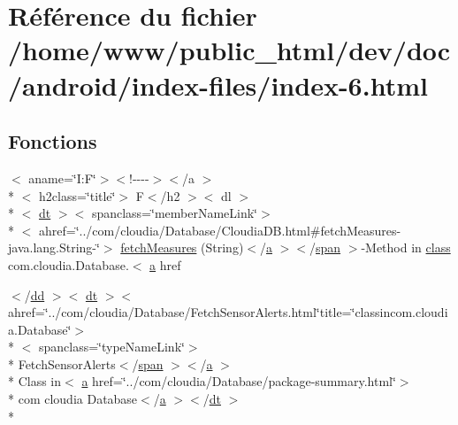\hypertarget{index-6_8html}{\section{Référence du fichier /home/www/public\-\_\-html/dev/doc/android/index-\/files/index-\/6.html}
\label{index-6_8html}
}
\subsection*{Fonctions}
\begin{DoxyCompactItemize}
\item 
$<$ aname=\char`\"{}I\-:\-F\char`\"{}$>$$<$!-\/-\/-\/-\/$>$$<$/a $>$\\*
$<$ h2class=\char`\"{}title\char`\"{}$>$ F$<$/h2 $>$$<$ dl $>$\\*
$<$ \hyperlink{stylesheet_8css_a107565fb4039d33b041380d6e0ea1d80}{dt} $>$$<$ spanclass=\char`\"{}member\-Name\-Link\char`\"{}$>$\\*
$<$ ahref=\char`\"{}../com/cloudia/Database/Cloudia\-D\-B.\-html\#fetch\-Measures-\/java.\-lang.\-String-\/\char`\"{}$>$ \hyperlink{index-6_8html_a28a7ce896f34ffaaf16bf4452ace4bbd}{fetch\-Measures} (String)$<$/\hyperlink{style_8css_a5e8981582017bb8b84c21f148345d1f7}{a} $>$$<$/\hyperlink{stylesheet_8css_a8343996ebcf16220b04e54659aac31cc}{span} $>$-\/Method in \hyperlink{_tools_8html_acf06f836132665ba8114f5a414c2403f}{class} com.\-cloudia.\-Database.$<$ \hyperlink{style_8css_a5e8981582017bb8b84c21f148345d1f7}{a} href
\item 
$<$/\hyperlink{stylesheet_8css_a47f4718a86835a7771ec592ece845221}{dd} $>$$<$ \hyperlink{stylesheet_8css_a107565fb4039d33b041380d6e0ea1d80}{dt} $>$$<$ ahref=\char`\"{}../com/cloudia/Database/Fetch\-Sensor\-Alerts.\-html\char`\"{}title=\char`\"{}classincom.\-cloudia.\-Database\char`\"{}$>$\\*
$<$ spanclass=\char`\"{}type\-Name\-Link\char`\"{}$>$\\*
 Fetch\-Sensor\-Alerts$<$/\hyperlink{stylesheet_8css_a8343996ebcf16220b04e54659aac31cc}{span} $>$$<$/\hyperlink{style_8css_a5e8981582017bb8b84c21f148345d1f7}{a} $>$\\*
 Class in$<$ \hyperlink{style_8css_a5e8981582017bb8b84c21f148345d1f7}{a} href=\char`\"{}../com/cloudia/Database/package-\/summary.\-html\char`\"{}$>$\\*
 com cloudia Database$<$/\hyperlink{style_8css_a5e8981582017bb8b84c21f148345d1f7}{a} $>$$<$/\hyperlink{stylesheet_8css_a107565fb4039d33b041380d6e0ea1d80}{dt} $>$\\*
$$
\end{DoxyCompactItemize}
